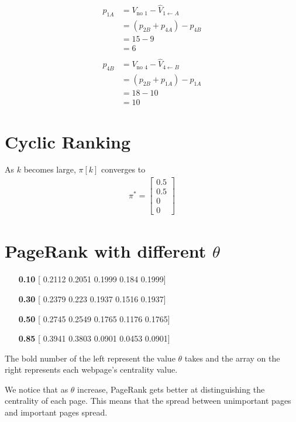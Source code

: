 \documentclass[]{article}
\begin{document}
\begin{align*}
	p_{1A} &= V_{\text{no } 1} - \hat{V}_{1 \leftarrow A} \\
		&= (p_{2B} + p_{4A}) - p_{4B} \\
		&= 15 - 9 \\
		&= 6 \\\\
	p_{4B} &= V_{\text{no } 4} - \hat{V}_{4 \leftarrow B} \\
		&= (p_{2B} + p_{1A}) - p_{1A} \\
		&= 18 - 10 \\
		&= 10
\end{align*}


\newpage
\section{Cyclic Ranking}

As $k$ becomes large, $\pi[k]$ converges to 
\begin{gather*}
	\pi^* = 
	\begin{bmatrix}
		0.5 \\
		0.5 \\
		0 \\
		0
	\end{bmatrix}
\end{gather*}


\newpage
\section{PageRank with different $\theta$}

\begin{enumerate}
	\item[\textbf{0.10}] [ 0.2112  0.2051  0.1999  0.184   0.1999]
	\item[\textbf{0.30}] [ 0.2379  0.223   0.1937  0.1516  0.1937]
	\item[\textbf{0.50}] [ 0.2745  0.2549  0.1765  0.1176  0.1765]
	\item[\textbf{0.85}] [ 0.3941  0.3803  0.0901  0.0453  0.0901]
\end{enumerate}

The bold number of the left represent the value $\theta$ takes and the array on the right represents each webpage's centrality value.

We notice that as $\theta$ increase, PageRank gets better at distinguishing the centrality of each page. This means that the spread between unimportant pages and important pages spread.
\end{document}
